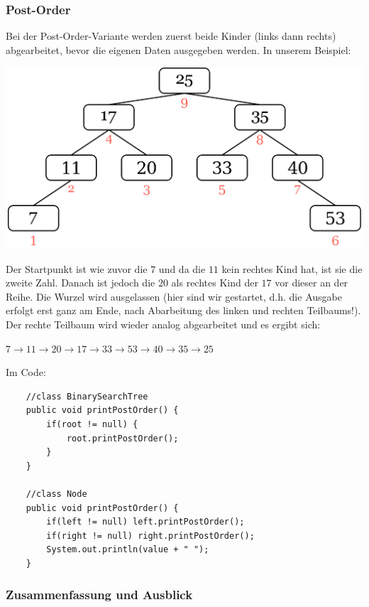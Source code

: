 \documentclass{article}
\begin{document}
\subsubsection{Post-Order}
Bei der Post-Order-Variante werden zuerst beide Kinder (links dann rechts) abgearbeitet, bevor die eigenen Daten ausgegeben werden. In unserem Beispiel: 
\begin{center}
    \includegraphics[scale=0.2]{../../media/postorder.png}
\end{center}
Der Startpunkt ist wie zuvor die $7$ und da die $11$ kein rechtes Kind hat, ist sie die zweite Zahl. Danach ist jedoch die $20$ als rechtes Kind der $17$ vor dieser an der Reihe. Die Wurzel wird ausgelassen (hier sind wir gestartet, d.h. die Ausgabe erfolgt erst ganz am Ende, nach Abarbeitung des linken und rechten Teilbaums!). Der rechte Teilbaum wird wieder analog abgearbeitet und es ergibt sich:
\begin{center}
    $7 \rightarrow 11 \rightarrow 20 \rightarrow 17 \rightarrow 33 \rightarrow 53 \rightarrow 40 \rightarrow 35 \rightarrow 25$
\end{center}
Im Code:
\begin{verbatim}
    //class BinarySearchTree
    public void printPostOrder() {
        if(root != null) {
            root.printPostOrder();
        }
    }

    //class Node 
    public void printPostOrder() {
        if(left != null) left.printPostOrder();
        if(right != null) right.printPostOrder();
        System.out.println(value + " ");
    }
\end{verbatim} 

\subsubsection{Zusammenfassung und Ausblick}
\end{document}

